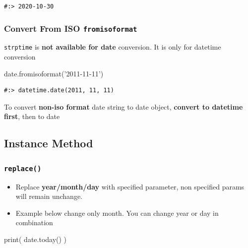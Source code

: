\documentclass[
]{book}
\newenvironment{Shaded}{\begin{snugshade}}{\end{snugshade}}
\newcommand{\BuiltInTok}[1]{#1}
\newcommand{\NormalTok}[1]{#1}
\newcommand{\StringTok}[1]{\textcolor[rgb]{0.5,0.5,0.5}{#1}}
\providecommand{\tightlist}{%
  \setlength{\itemsep}{0pt}\setlength{\parskip}{0pt}}
\begin{document}
\begin{verbatim}
#:> 2020-10-30
\end{verbatim}

\hypertarget{convert-from-iso-fromisoformat}{%
\subsubsection{\texorpdfstring{Convert From ISO \texttt{fromisoformat}}{Convert From ISO fromisoformat}}\label{convert-from-iso-fromisoformat}}

\texttt{strptime} is \textbf{not available for date} conversion. It is only for datetime conversion

\begin{Shaded}
\begin{Highlighting}[]
\NormalTok{date.fromisoformat(}\StringTok{'2011-11-11'}\NormalTok{)}
\end{Highlighting}
\end{Shaded}

\begin{verbatim}
#:> datetime.date(2011, 11, 11)
\end{verbatim}

To convert \textbf{non-iso format} date string to date object, \textbf{convert to datetime first}, then to date

\hypertarget{instance-method}{%
\subsection{Instance Method}\label{instance-method}}

\hypertarget{replace}{%
\subsubsection{\texorpdfstring{\texttt{replace()}}{replace()}}\label{replace}}

\begin{itemize}
\tightlist
\item
  Replace \textbf{year/month/day} with specified parameter, non specified params will remain unchange.\\
\item
  Example below change only month. You can change year or day in combination
\end{itemize}

\begin{Shaded}
\begin{Highlighting}[]
\BuiltInTok{print}\NormalTok{( date.today() )}
\end{Highlighting}
\end{Shaded}
\end{document}

